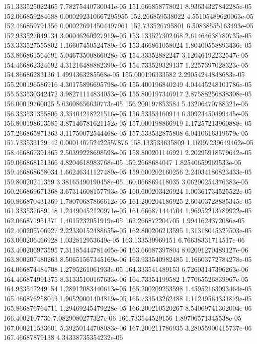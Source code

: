 {151.333525022465 7.78275440730041e-05
151.666858778021 8.93634327842285e-05
152.066859284688 0.000292310667295955
152.266859538022 4.55105489620063e-05
152.466859791356 0.000226914504497961
152.733526795801 6.50838555163493e-05
152.933527049134 3.00046260927919e-05
153.133527302468 2.61464638780735e-05
153.333527555802 1.16607450524789e-05
153.466861058024 1.80400558893436e-05
153.866861564691 5.04673500866028e-05
154.33352882247 3.12046192232547e-05
154.466862324692 4.31216488882399e-05
154.733529329137 1.2257397028323e-05
154.86686283136 1.4994363285568e-05
155.000196333582 2.29054244848683e-05
155.200196586916 4.30175896695798e-05
155.400196840249 4.04445248101786e-05
155.533530342472 3.98271114834053e-05
155.800197346917 2.87588256838308e-05
156.00019760025 5.63608656630773e-05
156.200197853584 5.43206470788321e-05
156.333531355806 3.35404218221516e-05
156.53353160914 6.30924450499445e-05
156.800198613585 3.87146781621152e-05
157.000198866919 1.17257213960888e-05
157.266865871363 3.11750072544468e-05
157.533532875808 6.0410616319679e-05
157.733533129142 0.000140752422557876
158.133533635809 1.16997239649462e-05
158.466867391365 2.50399228698598e-05
158.800201146921 2.20295918579642e-05
159.066868151366 4.8204618983768e-05
159.2668684047 1.82540659969533e-05
159.466868658034 1.66246341127489e-05
159.600202160256 2.24034186823433e-05
159.80020241359 3.38165490190458e-05
160.066869418035 3.06290254376383e-05
160.266869671368 3.67314608157793e-05
160.600203426924 1.00361734525522e-05
160.866870431369 1.78070687866612e-05
161.200204186925 2.60403728885345e-05
161.333537689148 1.24490452120971e-05
161.666871444704 1.96952213789922e-05
162.066871951371 1.4015232051919e-05
162.266872204705 1.9941624372086e-05
162.400205706927 2.22330152488655e-05
162.800206213595 1.31318045327503e-05
163.000206466928 1.032812953649e-05
163.133539969151 6.76638331714517e-06
163.400206973595 7.31185444781465e-06
163.66687397804 8.02091270489127e-06
163.800207480263 8.50651567345169e-06
163.933540982485 1.16603772784278e-05
164.066874484708 1.2795261061933e-05
164.333541489153 6.72603147396263e-06
164.466874991375 8.31335100167633e-06
164.73354199582 1.77065526839967e-05
164.933542249154 1.28912083440613e-05
165.200209253598 1.45952163093464e-05
165.466876258043 1.90520001404819e-05
165.733543262488 1.11249564331879e-05
165.866876764711 1.29469245479228e-05
166.200210520267 8.54069741362004e-06
166.4002107736 7.0829080277327e-06
166.733544529156 1.89706571345538e-05
167.000211533601 5.39250144708083e-06
167.200211786935 3.28055900415737e-06
167.46687879138 4.34338735354232e-06
}
